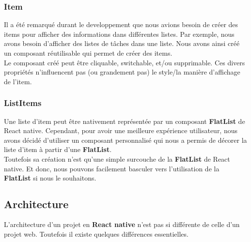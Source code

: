 \documentclass[12pt]{article}
\begin{document}
    \subsubsection{Item}{\label{subsubsec:item}}
    Il a été remarqué durant le developpement que nous avions besoin de créer des items pour afficher des informations
    dans différentes listes. Par exemple, nous avons besoin d'afficher des listes de tâches dans une liste. Nous avons
    ainsi créé un composant réutilisable qui permet de créer des items.\\
    Le composant créé peut être cliquable, switchable, et/ou supprimable. Ces divers propriétés n'influencent pas
    (ou grandement pas) le style/la manière d'affichage de l'item.\\

    \subsubsection{ListItems}{\label{subsec:list}}
    Une liste d'item peut être nativement représentée par un composant \textbf{FlatList} de React native. Cependant,
    pour avoir une meilleure expérience utilisateur, nous avons décidé d'utiliser un composant personnalisé qui nous a
    permis de décorer la liste d'item à partir d'une \textbf{FlatList}.\\
    Toutefois sa création n'est qu'une simple surcouche de la \textbf{FlatList} de React native. Et donc, nous pouvons
    facilement basculer vers l'utilisation de la \textbf{FlatList} si nous le souhaitons.\\

    \subsection{Architecture}{\label{subsec:arch}}
    L'architecture d'un projet en \textbf{React native} n'est pas si différente de celle d'un projet web. Toutefois
    il existe quelques différences essentielles.
\end{document}
